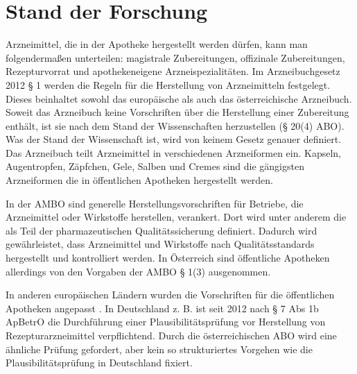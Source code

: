 \documentclass[12pt,a4paper]{article}
\begin{document}









\section{Stand der Forschung}
Arzneimittel, die in der Apotheke hergestellt werden dürfen, kann man folgendermaßen unterteilen: \gls{magistrale Zubereitungen}, \gls{offizinale Zubereitungen}, \gls{Rezepturvorrat} und apothekeneigene Arzneispezialitäten.
Im Arzneibuchgesetz 2012 § 1 werden die Regeln für die Herstellung von Arzneimitteln festgelegt.
Dieses beinhaltet sowohl das europäische als auch das österreichische Arzneibuch.
Soweit das Arzneibuch keine Vorschriften über die Herstellung einer Zubereitung enthält, ist sie nach dem Stand der Wissenschaften herzustellen (§ 20(4) \ac{ABO}).  Was der Stand der Wissenschaft ist, wird von keinem Gesetz genauer definiert. 
Das Arzneibuch teilt Arzneimittel in verschiedenen Arzneiformen ein. Kapseln, Augentropfen, Zäpfchen, Gele, Salben und Cremes sind die gängigsten Arzneiformen die in öffentlichen Apotheken hergestellt werden. 


In der \ac{AMBO} sind generelle Herstellungsvorschriften für Betriebe, die Arzneimittel oder Wirkstoffe herstellen, verankert. 
Dort wird unter anderem die  als Teil der pharmazeutischen Qualitätssicherung definiert. Dadurch wird gewährleistet, dass Arzneimittel und Wirkstoffe nach Qualitätsstandards hergestellt und kontrolliert werden. %
In Österreich sind öffentliche Apotheken allerdings von den Vorgaben der \ac{AMBO} § 1(3) ausgenommen.

In anderen europäischen Ländern wurden die Vorschriften für die öffentlichen Apotheken angepasst \cite{Holzer.2019}. %
In Deutschland z. B. ist seit 2012 nach § 7 Abs 1b ApBetrO die Durchführung einer Plausibilitätsprüfung vor Herstellung von Rezepturarzneimittel verpflichtend. Durch die österreichischen \ac{ABO} wird eine ähnliche Prüfung gefordert, aber kein so strukturiertes Vorgehen wie die Plausibilitätsprüfung in Deutschland fixiert. 
\end{document}
